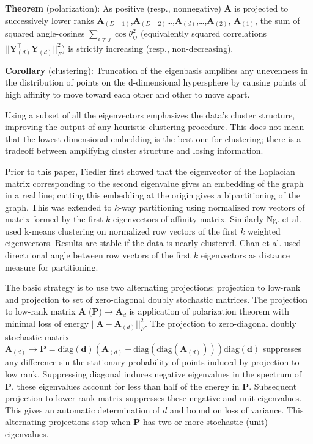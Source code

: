 \documentclass[10pt,a4paper,twoside]{report}
\theoremstyle{definition}
\newcommand{\norm}[1]{\lvert\lvert {#1} \rvert\rvert}
\begin{document}
	\textbf{Theorem} (polarization): As positive (resp., nonnegative) \textbf{A} is projected to successively lower ranks \textbf{A}$_{(D-1)}$,\textbf{A}$_{(D-2)}$\ldots,\textbf{A}$_{(d)}$,\ldots,\textbf{A}$_{(2)}$, \textbf{A}$_{(1)}$, the sum of squared angle-cosines $\sum_{i \ne j} \cos \theta_{ij}^2$ (equivalently squared correlations $\norm{\mathbf{Y}^\top_{(d)}\mathbf{Y}_{(d)}}^2_F$) is strictly increasing (resp., non-decreasing).
	
	\textbf{Corollary} (clustering): Truncation of the eigenbasis amplifies any unevenness in the distribution of points on the d-dimensional hypersphere by causing points of high affinity to move toward each other and other to move apart.
	
	Using a subset of all the eigenvectors emphasizes the data's cluster structure, improving the output of any heuristic clustering procedure. This does not mean that the lowest-dimensional embedding is the best one for clustering; there is a tradeoff between amplifying cluster structure and losing information.
	
	Prior to this paper, Fiedler first showed that the eigenvector of the Laplacian matrix corresponding to the second eigenvalue gives an embedding of the graph in a real line; cutting this embedding at the origin gives a bipartitioning of the graph. This was extended to $k$-way partitioning using normalized row vectors of matrix formed by the first $k$ eigenvectors of affinity matrix. Similarly Ng. et al. used k-means clustering on normalized row vectors of the first $k$ weighted eigenvectors. Results are stable if the data is nearly clustered. Chan et al. used directrional angle between row vectors of the first $k$ eigenvectors as distance measure for partitioning. 
	
	The basic strategy is to use two alternating projections: projection to low-rank and projection to set of zero-diagonal doubly stochastic matrices. The projection to low-rank matrix \textbf{A} (\textbf{P})$\rightarrow\mathbf{A}_{d}$ is application of polarization theorem with minimal loss of energy $\norm{\mathbf{A} - \mathbf{A}_{(d)}}^2_F$. The projection to zero-diagonal doubly stochastic matrix $\mathbf{A}_{(d)} \rightarrow \mathbf{P} = \text{diag}(\mathbf{d})(\mathbf{A}_{(d)} - \text{diag}(\text{diag}(\mathbf{A}_{(d)})))\text{diag}(\mathbf{d})$ suppresses any difference sin the stationary probability of points induced by projection to low rank. Suppressing diagonal induces negative eigenvalues in the spectrum of \textbf{P}, these eigenvalues account for less than half of the energy in \textbf{P}. Subsequent projection to lower rank matrix suppresses these negative and unit eigenvalues. This gives an automatic determination of $d$ and bound on loss of variance. This alternating projections stop when \textbf{P} has two or more stochastic (unit) eigenvalues. 
	
\end{document}
